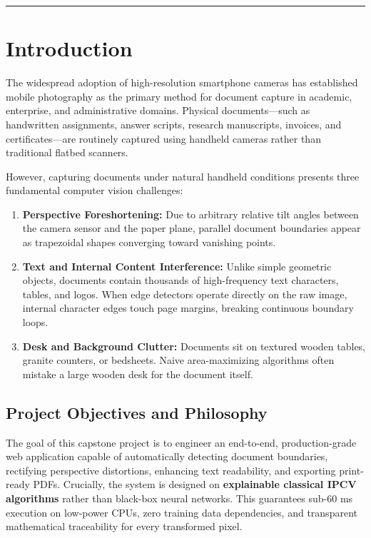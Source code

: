\documentclass[11pt,a4paper]{article}
\begin{document}
\tableofcontents

\vspace{0.8em}
\hrule
\vspace{1.2em}

\section{Introduction}
\label{sec:introduction}

The widespread adoption of high-resolution smartphone cameras has established mobile photography as the primary method for document capture in academic, enterprise, and administrative domains. Physical documents—such as handwritten assignments, answer scripts, research manuscripts, invoices, and certificates—are routinely captured using handheld cameras rather than traditional flatbed scanners.

However, capturing documents under natural handheld conditions presents three fundamental computer vision challenges:
\begin{enumerate}[label=(\alph*),leftmargin=1.8em,itemsep=0.15em]
    \item \textbf{Perspective Foreshortening:} Due to arbitrary relative tilt angles between the camera sensor and the paper plane, parallel document boundaries appear as trapezoidal shapes converging toward vanishing points.
    \item \textbf{Text and Internal Content Interference:} Unlike simple geometric objects, documents contain thousands of high-frequency text characters, tables, and logos. When edge detectors operate directly on the raw image, internal character edges touch page margins, breaking continuous boundary loops.
    \item \textbf{Desk and Background Clutter:} Documents sit on textured wooden tables, granite counters, or bedsheets. Naive area-maximizing algorithms often mistake a large wooden desk for the document itself.
\end{enumerate}

\subsection{Project Objectives and Philosophy}
The goal of this capstone project is to engineer an end-to-end, production-grade web application capable of automatically detecting document boundaries, rectifying perspective distortions, enhancing text readability, and exporting print-ready PDFs. Crucially, the system is designed on \textbf{explainable classical IPCV algorithms} rather than black-box neural networks. This guarantees sub-60 ms execution on low-power CPUs, zero training data dependencies, and transparent mathematical traceability for every transformed pixel.
\end{document}
